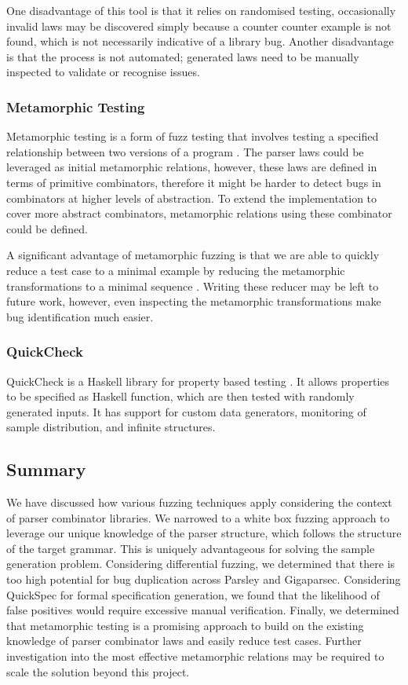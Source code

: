 \documentclass[11pt]{article}
\begin{document}
One disadvantage of this tool is that it relies on randomised testing, occasionally invalid laws may be discovered simply because a counter counter example is not found, which is not necessarily indicative of a library bug. Another disadvantage is that the process is not automated; generated laws need to be manually inspected to validate or recognise issues.

\subsubsection{Metamorphic Testing}

Metamorphic testing is a form of fuzz testing that involves testing a specified relationship between two versions of a program \cite{metamorphic}. The parser laws could be leveraged as initial metamorphic relations, however, these laws are defined in terms of primitive combinators, therefore it might be harder to detect bugs in combinators at higher levels of abstraction. To extend the implementation to cover more abstract combinators, metamorphic relations using these combinator could be defined.

A significant advantage of metamorphic fuzzing is that we are able to quickly reduce a test case to a minimal example by reducing the metamorphic transformations to a minimal sequence \cite{deduplication}. Writing these reducer may be left to future work, however, even inspecting the metamorphic transformations make bug identification much easier.

\subsubsection{QuickCheck}

QuickCheck is a Haskell library for property based testing \cite{quickcheck}. It allows properties to be specified as Haskell function, which are then tested with randomly generated inputs. It has support for custom data generators, monitoring of sample distribution, and infinite structures. 

\subsection{Summary}

We have discussed how various fuzzing techniques apply considering the context of parser combinator libraries. We narrowed to a white box fuzzing approach to leverage our unique knowledge of the parser structure, which follows the structure of the target grammar. This is uniquely advantageous for solving the sample generation problem. Considering differential fuzzing, we determined that there is too high potential for bug duplication across Parsley and Gigaparsec. Considering QuickSpec for formal specification generation, we found that the likelihood of false positives would require excessive manual verification. Finally, we determined that metamorphic testing is a promising approach to build on the existing knowledge of parser combinator laws and easily reduce test cases. Further investigation into the most effective metamorphic relations may be required to scale the solution beyond this project.
\end{document}
